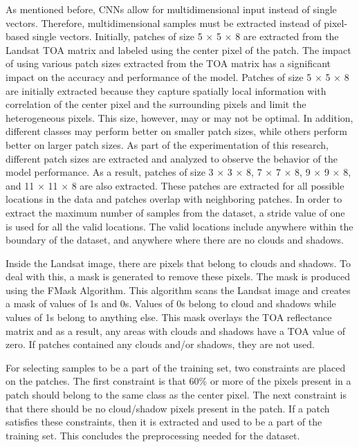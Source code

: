 \documentclass[letterpaper, 10 pt, conference]{ieeeconf}  %
\begin{document}
As mentioned before, CNNs allow for multidimensional input instead of single vectors. Therefore, multidimensional samples must be extracted instead of pixel-based single vectors. Initially, patches of size 5 $\times$ 5 $\times$ 8 are extracted from the Landsat TOA matrix and labeled using the center pixel of the patch. The impact of using various patch sizes extracted from the TOA matrix has a significant impact on the accuracy and performance of the model. Patches of size 5 $\times$ 5 $\times$ 8 are initially extracted because they capture spatially local information with correlation of the center pixel and the surrounding pixels and limit the heterogeneous pixels. This size, however, may or may not be optimal. In addition, different classes may perform better on smaller patch sizes, while others perform better on larger patch sizes. As part of the experimentation of this research, different patch sizes are extracted and analyzed to observe the behavior of the model performance. As a result, patches of size 3 $\times$ 3 $\times$ 8, 7 $\times$ 7 $\times$ 8, 9 $\times$ 9 $\times$ 8, and 11 $\times$ 11 $\times$ 8 are also extracted. These patches are extracted for all possible locations in the data and patches overlap with neighboring patches. In order to extract the maximum number of samples from the dataset, a stride value of one is used for all the valid locations. The valid locations include anywhere within the boundary of the dataset, and anywhere where there are no clouds and shadows.

Inside the Landsat image, there are pixels that belong to clouds and shadows. To deal with this, a mask is generated to remove these pixels. The mask is produced using the FMask Algorithm. This algorithm scans the Landsat image and creates a mask of values of 1s and 0s. Values of 0s belong to cloud and shadows while values of 1s belong to anything else. This mask overlays the TOA reflectance matrix and as a result, any areas with clouds and shadows have a TOA value of zero. If patches contained any clouds and/or shadows, they are not used.

For selecting samples to be a part of the training set, two constraints are placed on the patches. The first constraint is that 60\% or more of the pixels present in a patch should belong to the same class as the center pixel. The next constraint is that there should be no cloud/shadow pixels present in the patch. If a patch satisfies these constraints, then it is extracted and used to be a part of the training set. This concludes the preprocessing needed for the dataset.
\end{document}
